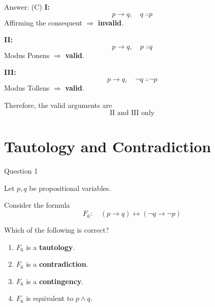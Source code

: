 \documentclass[aspectratio=169,11pt]{beamer}
\begin{document}
\begin{frame}
\begin{block}{Answer: (C)}
\textbf{I:} 
$$
p\to q,\quad q\;\therefore p
$$
Affirming the consequent $\Rightarrow$ \textbf{invalid}.

\textbf{II:}
$$
p\to q,\quad p\;\therefore q
$$
Modus Ponens $\Rightarrow$ \textbf{valid}.

\textbf{III:}
$$
p\to q,\quad \neg q\;\therefore\neg p
$$
Modus Tollens $\Rightarrow$ \textbf{valid}.

Therefore, the valid arguments are
$$
\boxed{\text{II and III only}}
$$
\end{block}
\end{frame}
\section{Tautology and Contradiction}
\begin{frame}{Question 1}

Let $p,q$ be propositional variables.

Consider the formula
$$
F_6:\quad (p\to q)\leftrightarrow(\neg q\to\neg p)
$$

Which of the following is correct?

\begin{enumerate}
    \item[(A)] $F_6$ is a \textbf{tautology}.
    \item[(B)] $F_6$ is a \textbf{contradiction}.
    \item[(C)] $F_6$ is a \textbf{contingency}.
    \item[(D)] $F_6$ is equivalent to $p\land q$.
\end{enumerate}

\end{frame}
\end{document}
